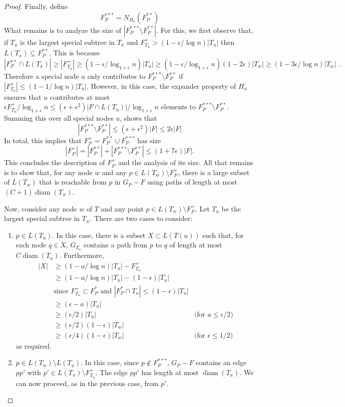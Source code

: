 \documentclass{patmorin}
\DeclareMathOperator{\diam}{diam}
\begin{document}
\begin{proof}
  Finally, define 
  \[  F^{***}_P = N_{H_u}(F^{**}_P)  \]
  What remains is to analyze the size of $|F^{***}_P\setminus F^{**}_P|$.
  For this, we first observe that, if $T_u$ is the largest special
  subtree in $T_x$ and $F^+_{T_u} > (1-\epsilon/\log n)|T_u|$ then
  $L(T_x)\subseteq F^{**}_P$.  This is because
  \[
     |F^{**}_P\cap L(T_x)| 
  \ge  
     |F^+_{T_u}|
  \ge  
     (1-\epsilon/\log_{1+\epsilon} n)|T_u|
  \ge  
     (1-\epsilon/\log_{1+\epsilon} n)(1-2\epsilon)|T_w|
  \ge  
     (1-3\epsilon/\log n)|T_w| \enspace .
  \]
  Therefore a special node $u$ only contributes to $F^{***}_P\setminus
  F^{**}_P$ if $|F^+_{T_u}| \le (1-1/\log n)|T_u|$.  However,
  in this case, the expander property of $H_u$ ensures that $u$
  contributes at most $\epsilon F^+_{T_u}/\log_{1+\epsilon} n\le
  (\epsilon+\epsilon^2)|F\cap L(T_u)|/\log_{1+\epsilon} n$ elements to
  $F^{***}_P\setminus F^{**}_P$.  Summing this over all special nodes $u$,
  shows that
  \[
     |F^{***}_P\setminus F^{**}_P| \le (\epsilon+\epsilon^2)|F| \le 2\epsilon|F|
  \]
  In total, this implies that $F^+_P = F^{**}_P\cup F^{***}_P$ has size
  \[ |F^+_P| = |F^{**}_P| + |F^{***}_P\setminus F^{**}_P|\le (1+7\epsilon)|F| .
  \]  
  This concludes the description of $F^+_P$ and the analysis of its
  size.  All that remains is to show that, for any node $w$ and any
  $p\in L(T_w)\setminus F^+_P$, there is a large subset of $L(T_w)$
  that is reachable from $p$ in $G_P-F$ using paths of length at most
  $(C+1)\diam(T_w)$.

  Now, consider any node $w$ of $T$ and any point $p\in L(T_w)\setminus
  F^+_P$.  Let $T_u$ be the largest special subtree in $T_w$.
  There are two cases to consider:
  \begin{enumerate}
    \item $p\in L(T_u)$. In this case, there is a subset $X\subset L(T(u))$
     such that, for each node $q\in X$, $G_{T_u}$ contains a path from
     $p$ to $q$ of length at most $C\diam(T_u)$. Furthermore,
    \begin{align*}
      |X| & \ge (1-a/\log n)|T_u| - F^+_{T_u} \\
          & \ge (1-a/\log n)|T_u| - (1-\epsilon)|T_u| \\
             & \text{since $F^+_{T_u} \subset F^*_P$ and $|F^*_P\cap T_u|\le (1-\epsilon)|T_u|$} \\
         & \ge (\epsilon-a)|T_u| \\ 
         & \ge (\epsilon/2)|T_u| 
           & \text{(for $a \le \epsilon/2$)}\\ 
         & \ge (\epsilon/2)(1-\epsilon)|T_w|  \\
         & \ge (\epsilon/4)(1-\epsilon)|T_w| 
           & \text{(for $\epsilon \le 1/2)$} 
    \end{align*}
    as required.

    \item $p\in L(T_w)\setminus L(T_u)$.  In this case, since $p\not\in
    F^{***}_P$, $G_P-F$ contains an edge $pp'$ with $p'\in L(T_u)\setminus
    F^{+}_{T_u}$.  The edge $pp'$ has length at most $\diam(T_x)$.
    We can now proceed, as in the previous case, from $p'$.
  \end{enumerate}
\end{proof}
\end{document}
